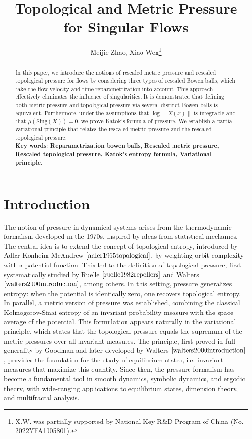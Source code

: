\documentclass[10pt]{article}
\newtheorem*{Theorem A}{Theorem A}
\begin{document}
\title{Topological and Metric Pressure for Singular Flows}
\author {Meijie Zhao, Xiao Wen\footnote{X.W. was partially supported by National Key R\&D Program of China (No. 2022YFA1005801).
}
}


\maketitle



\begin{abstract}
In this paper, we introduce the notions of rescaled metric pressure and rescaled topological pressure for flows by considering three types of rescaled Bowen balls, which take  the flow velocity and time reparametrization into account. This approach effectively eliminates the influence of singularities. It is demonstrated that defining both metric pressure and topological pressure via several distinct Bowen balls is equivalent. Furthermore, under the assumptions that $\log \|X(x)\|$ is integrable and that $\mu(\mathrm{Sing}(X))=0$, we prove Katok's formula of pressure. We establish a partial variational principle that relates the rescaled metric pressure and the rescaled topological pressure.\\

{\noindent\bf{Key words:} Reparametrization bowen balls, Rescaled metric pressure, Rescaled topological pressure, Katok's entropy formula, Variational principle.}

\end{abstract}


\section{Introduction}\label{sec:intro}
The notion of pressure in dynamical systems arises from the thermodynamic formalism developed in the 1970s, inspired by ideas from statistical mechanics. The central idea is to extend the concept of topological entropy, introduced by Adler-Konheim-McAndrew \(\cite{adler1965topological}\), by weighting orbit complexity with a potential function. This led to the definition of topological pressure, first systematically studied by Ruelle \(\cite{ruelle1982repellers}\) and Walters \(\cite{walters2000introduction}\), among others. In this setting, pressure generalizes entropy: when the potential is identically zero, one recovers topological entropy.
In parallel, a metric version of pressure was established, combining the classical Kolmogorov-Sinai entropy of an invariant probability measure with the space average of the potential. This formulation appears naturally in the variational principle, which states that the topological pressure equals the supremum of the metric pressures over all invariant measures. The principle, first proved in full generality by Goodman \cite{goodman1971relating} and later developed by Walters \(\cite{walters2000introduction}\), provides the foundation for the study of equilibrium states, i.e. invariant measures that maximize this quantity.
Since then, the pressure formalism has become a fundamental tool in smooth dynamics, symbolic dynamics, and ergodic theory, with wide-ranging applications to equilibrium states, dimension theory, and multifractal analysis.
\end{document}
